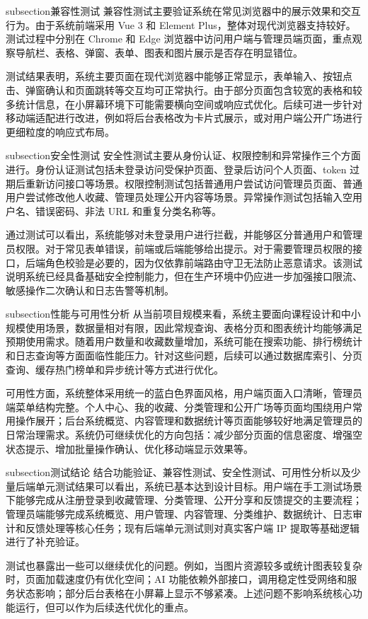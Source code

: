 subsection{兼容性测试}
兼容性测试主要验证系统在常见浏览器中的展示效果和交互行为。由于系统前端采用 Vue 3 和 Element Plus，整体对现代浏览器支持较好。测试过程中分别在 Chrome 和 Edge 浏览器中访问用户端与管理员端页面，重点观察导航栏、表格、弹窗、表单、图表和图片展示是否存在明显错位。

测试结果表明，系统主要页面在现代浏览器中能够正常显示，表单输入、按钮点击、弹窗确认和页面跳转等交互均可正常执行。由于部分页面包含较宽的表格和较多统计信息，在小屏幕环境下可能需要横向空间或响应式优化。后续可进一步针对移动端适配进行改进，例如将后台表格改为卡片式展示，或对用户端公开广场进行更细粒度的响应式布局。

subsection{安全性测试}
安全性测试主要从身份认证、权限控制和异常操作三个方面进行。身份认证测试包括未登录访问受保护页面、登录后访问个人页面、token 过期后重新访问接口等场景。权限控制测试包括普通用户尝试访问管理员页面、普通用户尝试修改他人收藏、管理员处理公开内容等场景。异常操作测试包括输入空用户名、错误密码、非法 URL 和重复分类名称等。

通过测试可以看出，系统能够对未登录用户进行拦截，并能够区分普通用户和管理员权限。对于常见表单错误，前端或后端能够给出提示。对于需要管理员权限的接口，后端角色校验是必要的，因为仅依靠前端路由守卫无法防止恶意请求。该测试说明系统已经具备基础安全控制能力，但在生产环境中仍应进一步加强接口限流、敏感操作二次确认和日志告警等机制。

subsection{性能与可用性分析}
从当前项目规模来看，系统主要面向课程设计和中小规模使用场景，数据量相对有限，因此常规查询、表格分页和图表统计均能够满足预期使用需求。随着用户数量和收藏数量增加，系统可能在搜索功能、排行榜统计和日志查询等方面面临性能压力。针对这些问题，后续可以通过数据库索引、分页查询、缓存热门榜单和异步统计等方式进行优化。

可用性方面，系统整体采用统一的蓝白色界面风格，用户端页面入口清晰，管理员端菜单结构完整。个人中心、我的收藏、分类管理和公开广场等页面均围绕用户常用操作展开；后台系统概览、内容管理和数据统计等页面能够较好地满足管理员的日常治理需求。系统仍可继续优化的方向包括：减少部分页面的信息密度、增强空状态提示、增加批量操作确认、优化移动端显示效果等。

subsection{测试结论}
结合功能验证、兼容性测试、安全性测试、可用性分析以及少量后端单元测试结果可以看出，系统已基本达到设计目标。用户端在手工测试场景下能够完成从注册登录到收藏管理、分类管理、公开分享和反馈提交的主要流程；管理员端能够完成系统概览、用户管理、内容管理、分类维护、数据统计、日志审计和反馈处理等核心任务；现有后端单元测试则对真实客户端 IP 提取等基础逻辑进行了补充验证。

测试也暴露出一些可以继续优化的问题。例如，当图片资源较多或统计图表较复杂时，页面加载速度仍有优化空间；AI 功能依赖外部接口，调用稳定性受网络和服务状态影响；部分后台表格在小屏幕上显示不够紧凑。上述问题不影响系统核心功能运行，但可以作为后续迭代优化的重点。


